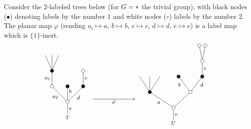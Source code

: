 \documentclass[a4paper,10pt]{article}%
\begin{document}
\begin{example}\label{LABELEDTREES EX}
Consider the $2$-labeled trees below (for $G=\**$ the trivial group), with black nodes ($\bullet$) denoting labels by the number $1$ and white nodes ($\circ$) labels by the number $2$.
The planar map $\varphi$ (sending $a_i\mapsto a$, 
$b \mapsto b$, $c \mapsto c$, $d \mapsto d$, $e \mapsto e$) is a label map which is $\{1\}$-inert.
\begin{equation}\label{SUBSDATUMTREESLAB EQ}
	\begin{tikzpicture}[grow=up,auto,level distance=2.1em,
	every node/.style = {font=\footnotesize,inner sep=2pt},
	dummy/.style={circle,draw,inner sep=0pt,minimum size=1.75mm}]
	\begin{scope}[level distance=2.3em]
	\tikzstyle{level 2}=[sibling distance=3.5em]%
	\tikzstyle{level 3}=[sibling distance=2.25em]%
	\tikzstyle{level 4}=[sibling distance=1.25em]%
	\tikzstyle{level 5}=[sibling distance=0.875em]%
		\node at (5.5,0) {$U$}
			child{node [dummy] {}
				child[sibling distance =5em]{node [dummy] {}
					child[sibling distance =3.5em]{node [dummy,fill=black] {}
						child{node [dummy] {}
							child{node [dummy] {}}
							child{node [dummy] {}}
						edge from parent node [swap] {$c$}}
					edge from parent node [swap, near end] {$d$}}
					child[sibling distance =3.5em]{node [dummy,fill=black] {}
					edge from parent node [near end] {$b$}}
				}
				child[sibling distance =7em]{node [dummy,fill=black] {}
					child[sibling distance =1.5em]
					child[sibling distance =1.5em]
					child[sibling distance =1.5em]
				edge from parent node {$a$}}
			edge from parent node [swap] {$e$}};
	\end{scope}
	\begin{scope}[level distance=2.3em]
	\tikzstyle{level 2}=[sibling distance=2.3em]%
	\tikzstyle{level 4}=[sibling distance=1em]%
		\node at (0,0.3) {$T$}
			child{node [dummy] {}
				child{node [dummy,fill=black] {}
					child{node [dummy] {}
					edge from parent node [swap] {$c$}}	
				edge from parent node [swap] {$d$}}
				child{node [dummy,fill=black] {}
				edge from parent node [near end,swap] {$b$}}
				child{node [dummy] {}
					child{node [dummy,fill=black] {}
						child
						child
						child
					edge from parent node {$a_1$}}
				edge from parent node {$a_2$}}
			edge from parent node [swap] {$e$}};
	\end{scope}
	\draw [->] (1.3,1.25) -- node[swap] {$\varphi$} (3.5,1.25);
	\end{tikzpicture}
\end{equation}
\end{example}
\end{document}
